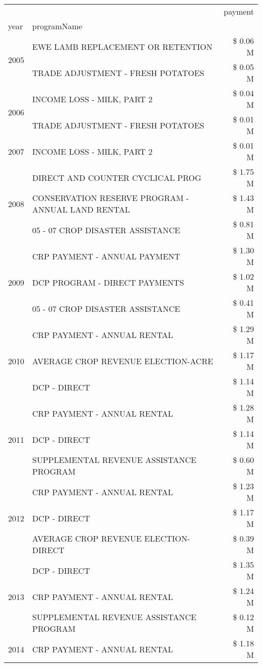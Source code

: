 \begin{tabular}{llr}
\toprule
 &  & payment \\
year & programName &  \\
\midrule
\multirow[t]{2}{*}{2005} & EWE LAMB REPLACEMENT OR RETENTION & \$ 0.06 M \\
 & TRADE ADJUSTMENT - FRESH POTATOES & \$ 0.05 M \\
\cline{1-3}
\multirow[t]{2}{*}{2006} & INCOME LOSS - MILK, PART 2 & \$ 0.04 M \\
 & TRADE ADJUSTMENT - FRESH POTATOES & \$ 0.01 M \\
\cline{1-3}
2007 & INCOME LOSS - MILK, PART 2 & \$ 0.01 M \\
\cline{1-3}
\multirow[t]{3}{*}{2008} & DIRECT AND COUNTER CYCLICAL PROG & \$ 1.75 M \\
 & CONSERVATION RESERVE PROGRAM - ANNUAL LAND RENTAL & \$ 1.43 M \\
 & 05 - 07 CROP DISASTER ASSISTANCE & \$ 0.81 M \\
\cline{1-3}
\multirow[t]{3}{*}{2009} & CRP PAYMENT - ANNUAL PAYMENT & \$ 1.30 M \\
 & DCP PROGRAM - DIRECT PAYMENTS & \$ 1.02 M \\
 & 05 - 07 CROP DISASTER ASSISTANCE & \$ 0.41 M \\
\cline{1-3}
\multirow[t]{3}{*}{2010} & CRP PAYMENT - ANNUAL RENTAL & \$ 1.29 M \\
 & AVERAGE CROP REVENUE ELECTION-ACRE & \$ 1.17 M \\
 & DCP - DIRECT & \$ 1.14 M \\
\cline{1-3}
\multirow[t]{3}{*}{2011} & CRP PAYMENT - ANNUAL RENTAL & \$ 1.28 M \\
 & DCP - DIRECT & \$ 1.14 M \\
 & SUPPLEMENTAL REVENUE ASSISTANCE PROGRAM & \$ 0.60 M \\
\cline{1-3}
\multirow[t]{3}{*}{2012} & CRP PAYMENT - ANNUAL RENTAL & \$ 1.23 M \\
 & DCP - DIRECT & \$ 1.17 M \\
 & AVERAGE CROP REVENUE ELECTION-DIRECT & \$ 0.39 M \\
\cline{1-3}
\multirow[t]{3}{*}{2013} & DCP - DIRECT & \$ 1.35 M \\
 & CRP PAYMENT - ANNUAL RENTAL & \$ 1.24 M \\
 & SUPPLEMENTAL REVENUE ASSISTANCE PROGRAM & \$ 0.12 M \\
\cline{1-3}
\multirow[t]{3}{*}{2014} & CRP PAYMENT - ANNUAL RENTAL & \$ 1.18 M \\

\end{tabular}

